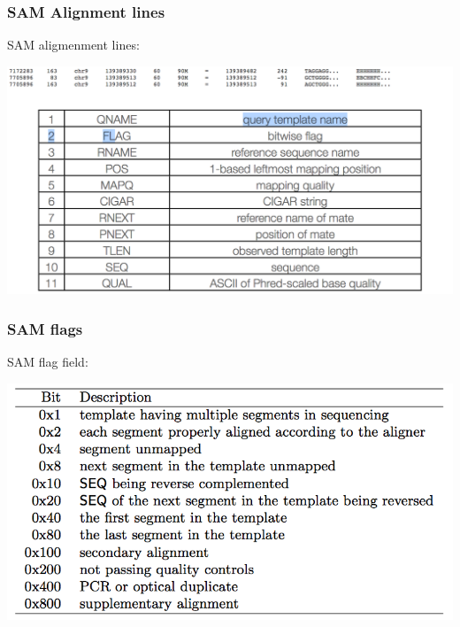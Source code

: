 \documentclass[pdf]{beamer}
\begin{document}
\begin{frame}
\frametitle{SAM Alignment lines}
SAM aligmenment lines:
\begin{center}
\includegraphics[scale=0.25]{Figures/sam.png} 
\end{center}
\end{frame}

\begin{frame}
\frametitle{SAM flags}
SAM flag field:
\begin{center}
\includegraphics[scale=0.4]{Figures/Sam-flag.png} 
\end{center}
\end{frame}
\end{document}
